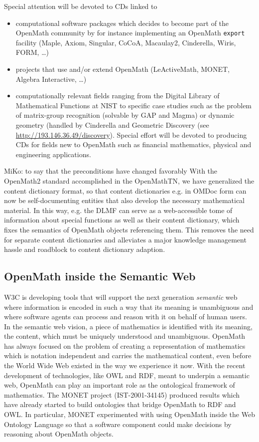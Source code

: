 \documentclass{euproposal}
\begin{document}
Special attention will be devoted to CDs linked to 
\begin{itemize}
\item computational software packages which decides to become part of
  the OpenMath community by for instance implementing an OpenMath
  \texttt{export} facility (Maple, Axiom, Singular, CoCoA, Macaulay2,
  Cinderella, Wiris, FORM, \ldots)
\item projects that use and/or extend OpenMath (LeActiveMath, MONET,
  Algebra Interactive, \ldots)
\item computationally relevant fields ranging from the Digital Library
  of Mathematical Functions at NIST to specific case studies such as
  the problem of matrix-group recognition (solvable by GAP and Magma)
  or dynamic geometry (handled by Cinderella and Geometric Discovery
  (see {\url{http://193.146.36.49/discovery}}). Special effort will be
  devoted to producing CDs for fields new to OpenMath such as
  financial mathematics, physical and engineering applications.
\end{itemize}
\begin{newpart}{MiKo: to say that the preconditions have changed favorably}
  With the OpenMath2 standard accomplished in the OpenMathTN, we have
  generalized the content dictionary format, so that content
  dictionaries e.g. in OMDoc form can now be self-documenting entities
  that also develop the necessary mathematical material. In this way,
  e.g. the DLMF can serve as a web-accessible tome of information
  about special functions as well as their content dictionary, which
  fixes the semantics of OpenMath objects referencing them. This
  removes the need for separate content dictionaries and alleviates a
  major knowledge management hassle and roadblock to content
  dictionary adaption.
\end{newpart}

\subsection{OpenMath inside the Semantic Web}

W3C is developing tools that will support the next generation
\emph{semantic} web where information is encoded in such a way that
its meaning is unambiguous and where software agents can process and
reason with it on behalf of human users.  In the semantic web vision,
a piece of mathematics is identified with its meaning, the content,
which must be uniquely understood and unambiguous.  OpenMath has
always focused on the problem of creating a representation of
mathematics which is notation independent and carries the mathematical
content, even before the World Wide Web existed in the way we
experience it now. With the recent development of technologies, like
OWL and RDF, meant to underpin a semantic web, OpenMath can play an
important role as the ontological framework of mathematics. The MONET
project (IST-2001-34145) produced results which have already started
to build ontologies that bridge OpenMath to RDF and OWL.  In
particular, MONET experimented with using OpenMath inside the Web
Ontology Language so that a software component could make decisions by
reasoning about OpenMath objects.
\end{document}

